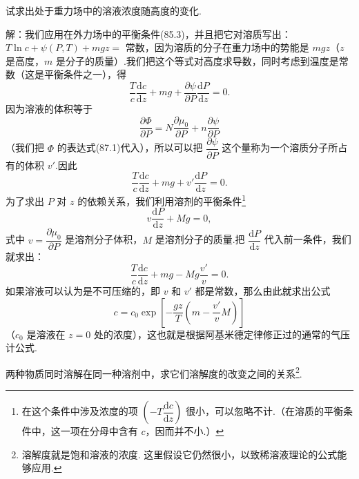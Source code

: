 \begin{xiti}

\quad 试求出处于重力场中的溶液浓度随高度的变化.

解：我们应用在外力场中的平衡条件(85.3)，并且把它对溶质写出：$T\ln c+\psi(P,T)+mgz=$ 常数，因为溶质的分子在重力场中的势能是 $mgz$（$z$ 是高度，$m$ 是分子的质量）.我们把这个等式对高度求导数，同时考虑到温度是常数（这是平衡条件之一），得
\begin{equation*}
  \frac{T}{c}\frac{\mathrm{d}c}{\mathrm{d}z}
  +mg+\frac{\partial\psi}{\partial P}\frac{\mathrm{d}P}{\mathrm{d}z}=0.
\end{equation*}
因为溶液的体积等于
\begin{equation*}
  \frac{\partial\varPhi}{\partial P}
  =N\frac{\partial\mu_0}{\partial P}+n\frac{\partial\psi}{\partial P}
\end{equation*}
（我们把 $\varPhi$ 的表达式(87.1)代入），所以可以把 $\dfrac{\partial\psi}{\partial P}$ 这个量称为一个溶质分子所占有的体积 $v'$.因此
\begin{equation*}
  \frac{T}{c}\frac{\mathrm{d}c}{\mathrm{d}z}
  +mg+v'\frac{\mathrm{d}P}{\mathrm{d}z}=0.
\end{equation*}
为了求出 $P$ 对 $z$ 的依赖关系，我们利用溶剂的平衡条件\footnote{在这个条件中涉及浓度的项 $\left(-T\dfrac{\mathrm{d}c}{\mathrm{d}z}\right)$ 很小，可以忽略不计.（在溶质的平衡条件中，这一项在分母中含有 $c$，因而并不小.）}
\begin{equation*}
  v\frac{\mathrm{d}P}{\mathrm{d}z}+Mg=0,
\end{equation*}
式中 $v=\dfrac{\partial\mu_0}{\partial P}$ 是溶剂分子体积，$M$ 是溶剂分子的质量.把 $\dfrac{\mathrm{d}P}{\mathrm{d}z}$ 代入前一条件，我们就求出：
\begin{equation*}
  \frac{T}{c}\frac{\mathrm{d}c}{\mathrm{d}z}
  +mg-Mg\frac{v'}{v}=0.
\end{equation*}
如果溶液可以认为是不可压缩的，即 $v$ 和 $v'$ 都是常数，那么由此就求出公式
\begin{equation*}
  c=c_0\exp\left[-\frac{gz}{T}\left(m-\frac{v'}{v}M\right)\right]
\end{equation*}
（$c_0$ 是溶液在 $z=0$ 处的浓度），这也就是根据阿基米德定律修正过的通常的气压计公式.

\quad 两种物质同时溶解在同一种溶剂中，求它们溶解度的改变之间的关系\footnote{溶解度就是饱和溶液的浓度. 这里假设它仍然很小，以致稀溶液理论的公式能够应用.}.


\end{xiti}
